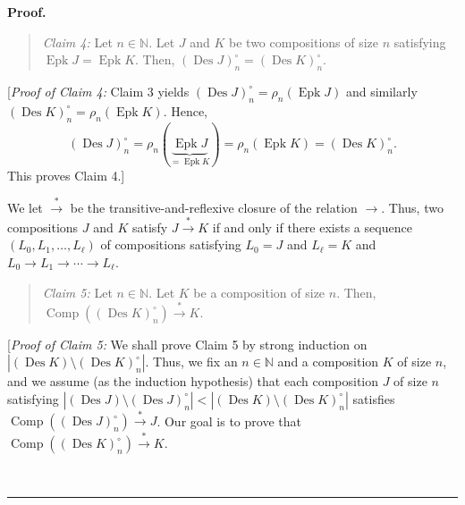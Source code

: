 \documentclass[numbers=enddot,12pt,final,onecolumn,notitlepage]{scrartcl}%
\theoremstyle{definition}
\newenvironment{statement}{\begin{quote}}{\end{quote}}
\newenvironment{proof}[1][Proof]{\noindent\textbf{#1.} }{\ \rule{0.5em}{0.5em}}
\begin{document}
\begin{proof}
\begin{statement}
\textit{Claim 4:} Let $n\in\mathbb{N}$. Let $J$ and $K$ be two compositions of
size $n$ satisfying $\operatorname*{Epk}J=\operatorname*{Epk}K$. Then,
$\left(  \operatorname*{Des}J\right)  _{n}^{\circ}=\left(  \operatorname*{Des}%
K\right)  _{n}^{\circ}$.
\end{statement}

[\textit{Proof of Claim 4:} Claim 3 yields $\left(  \operatorname*{Des}%
J\right)  _{n}^{\circ}=\rho_{n}\left(  \operatorname*{Epk}J\right)  $ and
similarly $\left(  \operatorname*{Des}K\right)  _{n}^{\circ}=\rho_{n}\left(
\operatorname*{Epk}K\right)  $. Hence,%
\[
\left(  \operatorname*{Des}J\right)  _{n}^{\circ}=\rho_{n}\left(
\underbrace{\operatorname*{Epk}J}_{=\operatorname*{Epk}K}\right)  =\rho
_{n}\left(  \operatorname*{Epk}K\right)  =\left(  \operatorname*{Des}K\right)
_{n}^{\circ}.
\]
This proves Claim 4.]

We let $\overset{\ast}{\rightarrow}$ be the transitive-and-reflexive closure
of the relation $\rightarrow$. Thus, two compositions $J$ and $K$ satisfy
$J\overset{\ast}{\rightarrow}K$ if and only if there exists a sequence
$\left(  L_{0},L_{1},\ldots,L_{\ell}\right)  $ of compositions satisfying
$L_{0}=J$ and $L_{\ell}=K$ and $L_{0}\rightarrow L_{1}\rightarrow
\cdots\rightarrow L_{\ell}$.

\begin{statement}
\textit{Claim 5:} Let $n\in\mathbb{N}$. Let $K$ be a composition of size $n$.
Then, $\operatorname*{Comp}\left(  \left(  \operatorname*{Des}K\right)
_{n}^{\circ}\right)  \overset{\ast}{\rightarrow}K$.
\end{statement}

[\textit{Proof of Claim 5:} We shall prove Claim 5 by strong induction on
$\left\vert \left(  \operatorname*{Des}K\right)  \setminus\left(
\operatorname*{Des}K\right)  _{n}^{\circ}\right\vert $. Thus, we fix an
$n\in\mathbb{N}$ and a composition $K$ of size $n$, and we assume (as the
induction hypothesis) that each composition $J$ of size $n$ satisfying
$\left\vert \left(  \operatorname*{Des}J\right)  \setminus\left(
\operatorname*{Des}J\right)  _{n}^{\circ}\right\vert <\left\vert \left(
\operatorname*{Des}K\right)  \setminus\left(  \operatorname*{Des}K\right)
_{n}^{\circ}\right\vert $ satisfies $\operatorname*{Comp}\left(  \left(
\operatorname*{Des}J\right)  _{n}^{\circ}\right)  \overset{\ast}{\rightarrow
}J$. Our goal is to prove that $\operatorname*{Comp}\left(  \left(
\operatorname*{Des}K\right)  _{n}^{\circ}\right)  \overset{\ast}{\rightarrow
}K$.


\end{proof}
\end{document}
